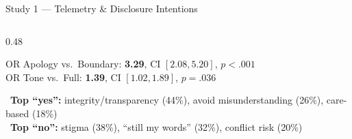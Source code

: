 \documentclass[10pt,aspectratio=169]{beamer}
\begin{document}
\begin{frame}{Study 1 --- Telemetry \& Disclosure Intentions}
\begin{columns}[T]
\begin{column}{0.48\textwidth}
\begin{alertbox}
  {\scriptsize OR Apology vs.\ Boundary: \textbf{3.29}, CI $[2.08,5.20]$, $p{<}.001$\\
  OR Tone vs.\ Full: \textbf{1.39}, CI $[1.02,1.89]$, $p{=}.036$}
  \vspace{4pt}

  \textcolor{chiGreen}{\faCheckCircle}~\textbf{Top ``yes'':} integrity/transparency (44\%), avoid misunderstanding (26\%), care-based (18\%)\\[2pt]
  \textcolor{chiRed}{\faTimesCircle}~\textbf{Top ``no'':} stigma (38\%), ``still my words'' (32\%), conflict risk (20\%)
  \end{alertbox}
\end{column}
\end{columns}
\end{frame}

\end{document}
